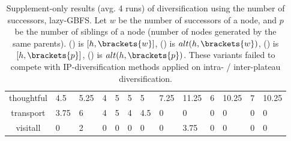 \begin{table*}[htbp]
\begin{tabularx}{\linewidth}{|c|X|X|X|X|X|X||X|X|X|X|X|X|}
thoughtful      & 4.5    & 5.25   & 4      & 5      & 5      & 5      & 7.25   & 11.25  & 6      & 10.25  & 7      & 10.25  \\ 
transport       & 3.75   & 6      & 4      & 5      & 4      & 4.5    & 0      & 0      & 0      & 0      & 0      & 0      \\ 
visitall        & 0      & 2      & 0      & 0      & 0      & 0      & 0      & 3.75   & 0      & 0      & 0      & 0      \\ 
\end{tabularx}
\caption{
Supplement-only results (avg. 4 runs) of diversification using the number of successors, lazy-GBFS.
Let $w$ be the number of successors of a node, and $p$ be the number of siblings of a node (number of nodes generated by the same parents).
() is $[h,\brackets{w}]$,
() is $alt(h,\brackets{w})$,
() is $[h,\brackets{p}]$,
() is $alt(h,\brackets{p})$.
These variants failed to compete with IP-diversification methods applied on intra- / inter-plateau diversification.
}
\label{tbl:hwWpP-lazy}
\end{table*}
